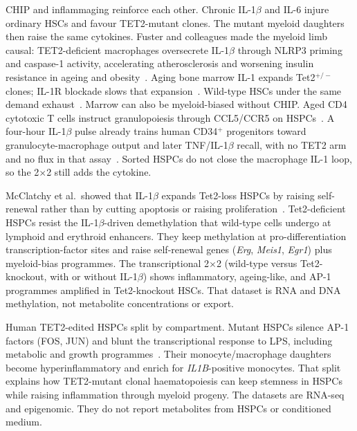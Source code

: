 \documentclass[11pt]{article}
\begin{document}
CHIP and inflammaging reinforce each other. Chronic IL-1$\beta$ and IL-6 injure ordinary
HSCs and favour TET2-mutant clones. The mutant myeloid daughters then raise the same
cytokines. Fuster and colleagues made the myeloid limb causal: TET2-deficient
macrophages oversecrete IL-1$\beta$ through NLRP3 priming and caspase-1 activity,
accelerating atherosclerosis and worsening insulin resistance in ageing and
obesity~\cite{Fuster2017TET2athero,Fuster2020TET2insulin}. Aging bone marrow IL-1
expands Tet2$^{+/-}$ clones; IL-1R blockade slows that
expansion~\cite{Caiado2022Tet2IL1,Caiado2024IL1AgingHSC}. Wild-type HSCs under the same
demand exhaust~\cite{Kovtonyuk2022IL1Microbiome}. Marrow can also be myeloid-biased
without CHIP. Aged CD4 cytotoxic T cells instruct granulopoiesis through CCL5/CCR5 on
HSPCs~\cite{GabandeRodriguez2026CD4CTL}. A four-hour IL-1$\beta$ pulse already trains
human CD34$^{+}$ progenitors toward granulocyte-macrophage output and later
TNF/IL-1$\beta$ recall, with no TET2 arm and no flux in that
assay~\cite{FloresGomez2024IL1training}. Sorted HSPCs do not close the macrophage IL-1
loop, so the 2$\times$2 still adds the cytokine.

McClatchy et al.\ showed that IL-1$\beta$ expands Tet2-loss HSPCs by raising self-renewal
rather than by cutting apoptosis or raising proliferation~\cite{McClatchy2023TET2IL1}.
Tet2-deficient HSPCs resist the IL-1$\beta$-driven demethylation that wild-type cells
undergo at lymphoid and erythroid enhancers. They keep methylation at
pro-differentiation transcription-factor sites and raise self-renewal genes
(\textit{Erg}, \textit{Meis1}, \textit{Egr1}) plus myeloid-bias programmes. The
transcriptional 2$\times$2 (wild-type versus Tet2-knockout, with or without IL-1$\beta$)
shows inflammatory, ageing-like, and AP-1 programmes amplified in Tet2-knockout HSCs.
That dataset is RNA and DNA methylation, not metabolite concentrations or export.

Human TET2-edited HSPCs split by compartment. Mutant HSPCs silence AP-1 factors (FOS,
JUN) and blunt the transcriptional response to LPS, including metabolic and growth
programmes~\cite{HuergaEncabo2026TET2inflammation}. Their monocyte/macrophage daughters
become hyperinflammatory and enrich for \textit{IL1B}-positive monocytes. That split
explains how TET2-mutant clonal haematopoiesis can keep stemness in HSPCs while raising
inflammation through myeloid progeny. The datasets are RNA-seq and epigenomic. They do
not report metabolites from HSPCs or conditioned medium.
\end{document}
